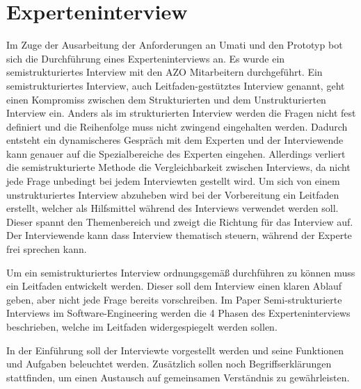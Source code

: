 \documentclass[a4paper, 12pt, oneside]{scrbook}
\begin{document}
	
	 
	
	
	\section{Experteninterview}
	
	Im Zuge der Ausarbeitung der Anforderungen an Umati und den Prototyp bot sich die Durchführung eines Experteninterviews an. Es wurde ein semistrukturiertes Interview mit den AZO Mitarbeitern %
	durchgeführt. Ein semistrukturiertes Interview, auch Leitfaden-gestütztes Interview genannt, geht einen Kompromiss zwischen dem Strukturierten und dem Unstrukturierten Interview ein. Anders als im strukturierten Interview werden die Fragen nicht fest definiert und die Reihenfolge muss nicht zwingend eingehalten werden. Dadurch entsteht ein dynamischeres Gespräch mit dem Experten und der Interviewende kann genauer auf die Spezialbereiche des Experten eingehen. Allerdings verliert die semistrukturierte Methode die Vergleichbarkeit zwischen Interviews, da nicht jede Frage unbedingt bei jedem Interviewten gestellt wird. Um sich von einem unstrukturiertes Interview abzuheben wird bei der Vorbereitung ein Leitfaden erstellt, welcher als Hilfsmittel während des Interviews verwendet werden soll. Dieser spannt den Themenbereich und zweigt die Richtung für das Interview auf. Der Interviewende kann dass Interview thematisch steuern, während der Experte frei sprechen kann. \cite{wesel_semi-strukturierte_2010}
	
	
	Um ein semistrukturiertes Interview ordnungsgemäß durchführen zu können muss ein Leitfaden entwickelt werden. Dieser soll dem Interview einen klaren Ablauf geben, aber nicht jede Frage bereits vorschreiben. Im Paper Semi-strukturierte Interviews im Software-Engineering werden die 4 Phasen des Experteninterviews beschrieben, welche im Leitfaden widergespiegelt werden sollen. \cite{wesel_semi-strukturierte_2010}
	
	In der Einführung soll der Interviewte vorgestellt werden und seine Funktionen und Aufgaben beleuchtet werden. Zusätzlich sollen noch Begriffserklärungen stattfinden, um einen Austausch auf gemeinsamen Verständnis zu gewährleisten. \cite{wesel_semi-strukturierte_2010}
	
\end{document}
